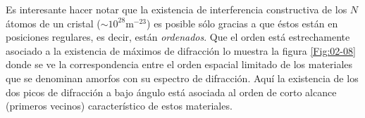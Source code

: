 Es interesante hacer notar que la existencia de interferencia constructiva de los $N$ átomos de un cristal ($\sim 10^{28} \text{m}^{-23}$) es posible sólo gracias a que éstos están en posiciones regulares, es decir, están \textit{ordenados}. Que el orden está estrechamente asociado a la existencia de máximos de difracción lo muestra la figura \ref{Fig:02-08} donde se ve la correspondencia entre el orden espacial limitado de los materiales que se denominan amorfos con su espectro de difracción. Aquí la existencia de los dos picos de difracción a bajo ángulo está asociada al orden de corto alcance (primeros vecinos) característico de estos materiales.












